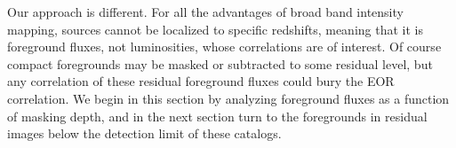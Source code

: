 \documentclass[numberedappendix]{emulateapj}
\begin{document}
Our approach is different. For all the advantages of broad band intensity mapping, sources cannot be localized to specific redshifts, meaning that it is foreground fluxes, not luminosities, whose correlations are of interest. Of course compact foregrounds may be masked or subtracted to some residual level, but any correlation of these residual foreground fluxes could bury the EOR correlation. We begin in this section by analyzing foreground fluxes as a function of masking depth, and in the next section turn to the foregrounds in residual images below the detection limit of these catalogs. %
\end{document}
